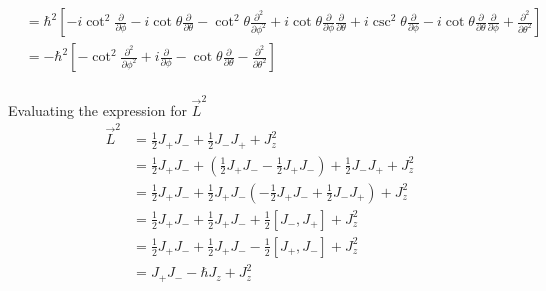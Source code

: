\documentclass[letter, 10pts]{article}
\newcommand{\hb}{\hbar}
\begin{document}
\begin{align*}
&= \hb^2 
\left[
- i \cot ^2 \frac{\partial }{\partial \phi} 
- i \cot \theta \frac{\partial}{\partial \theta}
- \cot ^2 \theta \frac{\partial ^2}{\partial \phi^2}  
+ i \cot \theta \frac{\partial}{\partial \phi} \frac{\partial }{\partial \theta}
+ i \csc ^2 \theta \frac{\partial}{\partial \phi} 
- i \cot \theta \frac{\partial}{\partial \theta} \frac{\partial}{ \partial \phi	}
+ 
\frac{\partial ^2 }{\partial \theta ^2}
\right]
\\ &=
- \hb ^2 \left [- \cot ^2 \frac{\partial ^2}{\partial \phi ^2}
+ i \frac{\partial }{\partial \phi} 
- \cot \theta \frac{\partial }{\partial \theta} 
- \frac{\partial ^2}{\partial \theta ^2}\right]
\\
\end{align*}






Evaluating the expression for $\vec{L}^2 $
\begin{align*}
	\vec{L}^2 &= \frac{1}{2} J_+ J_- + \frac{1}{2} J_- J_+ + J_z^2 \\ 
	&= 
	\frac{1}{2} J_+ J_- 
	+ 
\left(	\frac{1}{2} J_+ J_- 
	- \frac{1}{2} J_+ J_-  \right ) 
	+ \frac{1}{2} J_- J_+ + J_z^2 \\ 
	&= 
	\frac{1}{2} J_+ J_- 
	+ 
	\frac{1}{2} J_+ J_- 
\left(	- \frac{1}{2} J_+ J_-   
	+ \frac{1}{2} J_- J_+  \right) 
	+ J_z^2 \\ 
	&= 
	\frac{1}{2} J_+ J_- 
	+ 
	\frac{1}{2} J_+ J_-  
	+ \frac{1}{2} [J_-, J_+] 
	+ J_z^2 \\ 
	&= 
	\frac{1}{2} J_+ J_- 
	+ 
	\frac{1}{2} J_+ J_-  
	- \frac{1}{2 } [J_+, J_-] 
	+ J_z^2 \\ 
	&= 
	J_+ J_-  
	-  \hb  J_z
	+ J_z^2 \\ 
\end{align*}
\end{document}
